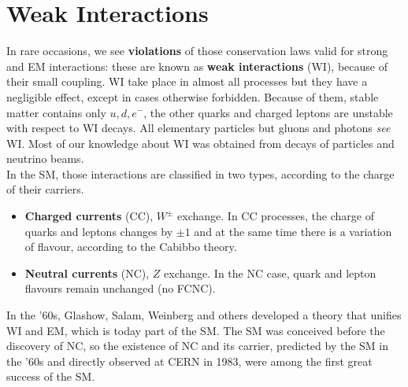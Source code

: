 \documentclass[10.75pt,a4paper,openright,bottom=2cm]{article}
\newcommand{\beginbox}[1]{\begin{tcolorbox}[width=\textwidth,colback={yellow!50},title={#1},colbacktitle={gray!50},coltitle=black]}
\renewcommand{\endbox}{\end{tcolorbox}\noindent}
\begin{document}
\section{Weak Interactions}
In rare occasions, we see \textbf{violations} of those conservation laws valid for strong and EM interactions: these are known as \textbf{weak interactions} (WI), because of their small coupling. WI take place in almost all processes but they have a negligible effect, except in cases otherwise forbidden. Because of them, stable matter contains only $u,d,e^-$, the other quarks and charged leptons are unstable with respect to WI decays. All elementary particles but gluons and photons \textit{see} WI. Most of our knowledge about WI was obtained from decays of particles and neutrino beams.\\
In the SM, those interactions are classified in two types, according to the charge of their carriers.
\beginbox{Types of Currents in the Weak Interactions}
\begin{itemize}
    \item \textbf{Charged currents} (CC), $W^\pm$ exchange. In CC processes, the charge of quarks and leptons changes by $\pm1$ and at the same time there is a variation of flavour, according to the Cabibbo theory.
    \item \textbf{Neutral currents} (NC), $Z$ exchange. In the NC case, quark and lepton flavours remain unchanged (no FCNC).
\end{itemize}
\endbox
In the '60s, Glashow, Salam, Weinberg and others developed a theory that unifies WI and EM, which is today part of the SM. The SM was conceived before the discovery of NC, so the existence of NC and its carrier, predicted by the SM in the '60s and directly observed at CERN in 1983, were among the first great success of the SM.
\end{document}
